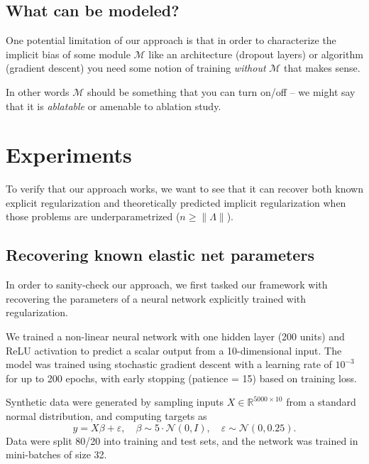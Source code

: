 \documentclass[10pt]{article}
\begin{document}
{\subsection{What can be modeled?}
One potential limitation of our approach is that in order to characterize the implicit bias of some module $\mathcal{M}$ like an architecture (dropout layers) or algorithm (gradient descent) you need some notion of training \emph{without} $\mathcal{M}$ that makes sense. 

In other words $\mathcal{M}$ should be something that you can turn on/off -- we might say that it is \emph{ablatable} or amenable to ablation study.
}


\section{Experiments}

To verify that our approach works, we want to see that it can recover both known explicit regularization and theoretically predicted implicit regularization when those problems are underparametrized ($n \geq \| \Lambda \|$).

\subsection{Recovering known elastic net parameters}
\label{sec:elastic-net}
In order to sanity-check our approach, we first tasked our framework with recovering the parameters of a neural network explicitly trained with regularization. 

We trained a non-linear neural network with one hidden layer (200 units) and ReLU activation to predict a scalar output from a 10-dimensional input. The model was trained using stochastic gradient descent with a learning rate of $10^{-3}$ for up to 200 epochs, with early stopping (patience = 15) based on training loss.

Synthetic data were generated by sampling inputs $X \in \mathbb{R}^{5000 \times 10}$ from a standard normal distribution, and computing targets as
\[
y = X\beta + \varepsilon, \quad \beta \sim 5 \cdot \mathcal{N}(0, I), \quad \varepsilon \sim \mathcal{N}(0, 0.25).
\]
Data were split 80/20 into training and test sets, and the network was trained in mini-batches of size 32.

\end{document}
